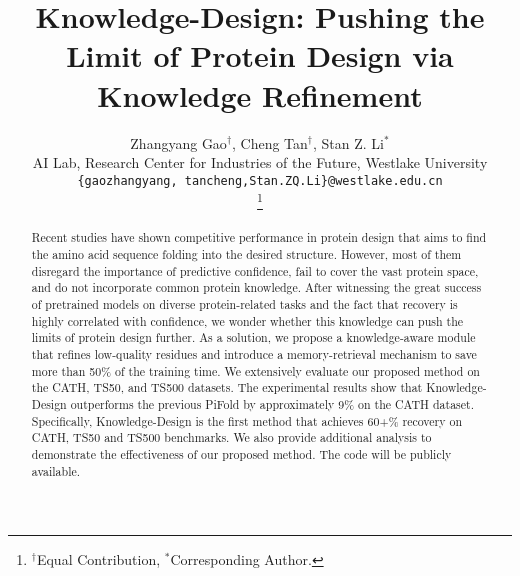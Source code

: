 \documentclass{article}
\author{Zhangyang Gao$^{\dagger}$, Cheng Tan$^{\dagger}$, Stan Z. Li$^{*}$\\
AI Lab, Research Center for Industries of the Future, Westlake University \\
\texttt{\{gaozhangyang, tancheng,Stan.ZQ.Li\}@westlake.edu.cn}\\
\thanks{$^{\dagger}$Equal Contribution, $^{*}$Corresponding Author.}
}
\title{Knowledge-Design: Pushing the Limit of Protein Design via Knowledge Refinement}
\begin{document}
\maketitle

\vspace{-7mm}
\begin{abstract}
  \vspace{-2mm}
  Recent studies have shown competitive performance in protein design that aims to find the amino acid sequence folding into the desired structure. However, most of them disregard the importance of predictive confidence, fail to cover the vast protein space, and do not incorporate common protein knowledge. After witnessing the great success of pretrained models on diverse protein-related tasks and the fact that recovery is highly correlated with confidence, we wonder whether this knowledge can push the limits of protein design further. As a solution, we propose a knowledge-aware module that refines low-quality residues and introduce a memory-retrieval mechanism to save more than 50\% of the training time. We extensively evaluate our proposed method on the CATH, TS50, and TS500 datasets. The experimental results show that Knowledge-Design outperforms the previous PiFold by approximately 9\% on the CATH dataset. Specifically, Knowledge-Design is the first method that achieves 60+\% recovery on CATH, TS50 and TS500 benchmarks. We also provide additional analysis to demonstrate the effectiveness of our proposed method. The code will be publicly available.
\end{abstract}


\vspace{-6mm}
\end{document}
